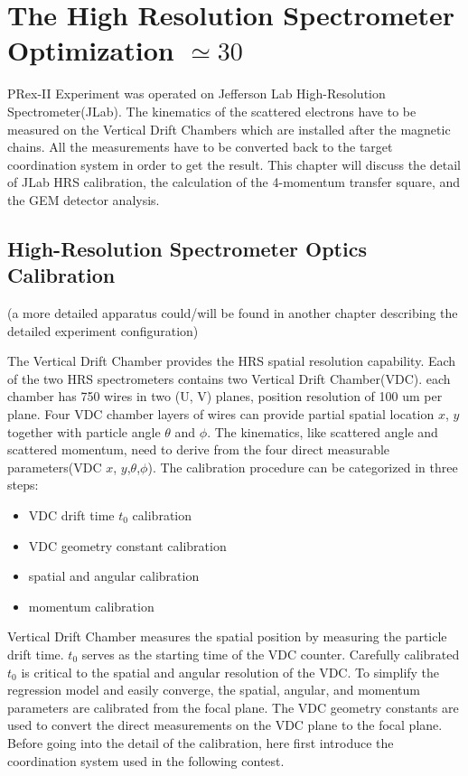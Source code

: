   \chapter{The High Resolution Spectrometer Optimization $\simeq 30$}

PRex-II Experiment was operated on Jefferson Lab High-Resolution Spectrometer(JLab). The kinematics of the scattered electrons have to be measured on the Vertical Drift Chambers which are installed after the magnetic chains. All the measurements have to be converted back to the target coordination system in order to get the result. This chapter will discuss the detail of JLab HRS calibration, the calculation of the 4-momentum transfer square, and the GEM detector analysis. 


\section{High-Resolution Spectrometer Optics Calibration}

(a more detailed apparatus could/will be found in another chapter describing the detailed experiment configuration)

The Vertical Drift Chamber provides the HRS spatial resolution capability. Each of the two HRS spectrometers contains two Vertical Drift Chamber(VDC). each chamber has 750 wires in two (U, V) planes, position resolution of 100 um per plane. Four VDC chamber layers of wires can provide partial spatial location $x$, $y$ together with particle angle $\theta$ and $\phi$. The kinematics, like scattered angle and scattered momentum, need to derive from the four direct measurable parameters(VDC $x$, $y$,$\theta$,$\phi$). The calibration procedure can be categorized in three steps:

\begin{itemize}
    \item VDC drift time $t_0$ calibration
    \item VDC geometry constant calibration 
    \item spatial and angular calibration
    \item momentum calibration
\end{itemize}

Vertical Drift Chamber measures the spatial position by measuring the particle drift time. $t_0$ serves as the starting time of the VDC counter. Carefully calibrated $t_0$ is critical to the spatial and angular resolution of the VDC. To simplify the regression model and easily converge, the spatial, angular, and momentum parameters are calibrated from the focal plane. The VDC geometry constants are used to convert the direct measurements on the VDC plane to the focal plane. Before going into the detail of the calibration, here first introduce the coordination system used in the following contest. 

